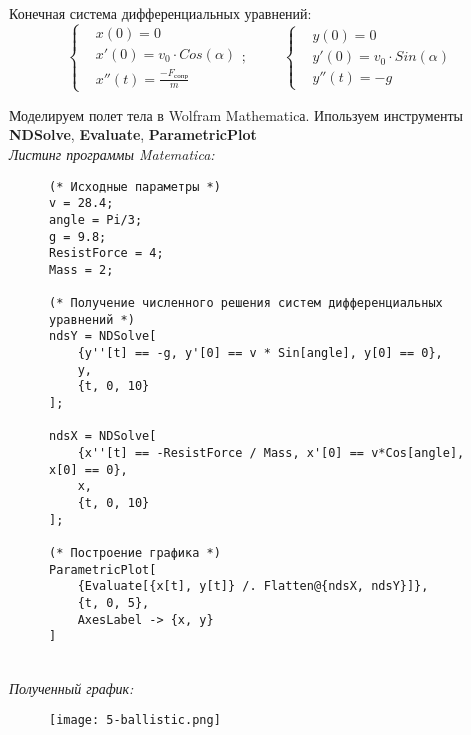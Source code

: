 Конечная система дифференциальных уравнений:
\begin{equation*}
    \left\{
        \begin{aligned}
            &x(0) = 0 \\
            &x'(0) = v_{0} \cdot Cos(\alpha) \\
            &x''(t) = \frac{-F_{\text{сопр}}}{m}
        \end{aligned}
    \right.; \;\;\;\;\;\;\;\;\;
    \left\{
        \begin{aligned}
            &y(0) = 0 \\
            &y'(0) = v_{0} \cdot Sin(\alpha) \\
            &y''(t) = -g
        \end{aligned}
    \right. \end{equation*}

\newpage
Моделируем полет тела в Wolfram Mathematicа. 
Ипользуем инструменты 
\textbf{NDSolve}, 
\textbf{Evaluate},
\textbf{ParametricPlot}\\

\textit{Листинг программы Matematica:}
\begin{figure}[ht]
    \begin{lstlisting}
(* Исходные параметры *)
v = 28.4;
angle = Pi/3;
g = 9.8;
ResistForce = 4;
Mass = 2;

(* Получение численного решения систем дифференциальных уравнений *)
ndsY = NDSolve[
    {y''[t] == -g, y'[0] == v * Sin[angle], y[0] == 0}, 
    y, 
    {t, 0, 10}
];
   
ndsX = NDSolve[
    {x''[t] == -ResistForce / Mass, x'[0] == v*Cos[angle], x[0] == 0}, 
    x, 
    {t, 0, 10}
];

(* Построение графика *)
ParametricPlot[
    {Evaluate[{x[t], y[t]} /. Flatten@{ndsX, ndsY}]}, 
    {t, 0, 5},
    AxesLabel -> {x, y}
] 
    \end{lstlisting} 
\end{figure}\\
\textit{Полученный график:}
\begin{figure}[ht]
\centering
\texttt{[image: 5-ballistic.png]}
\end{figure}
